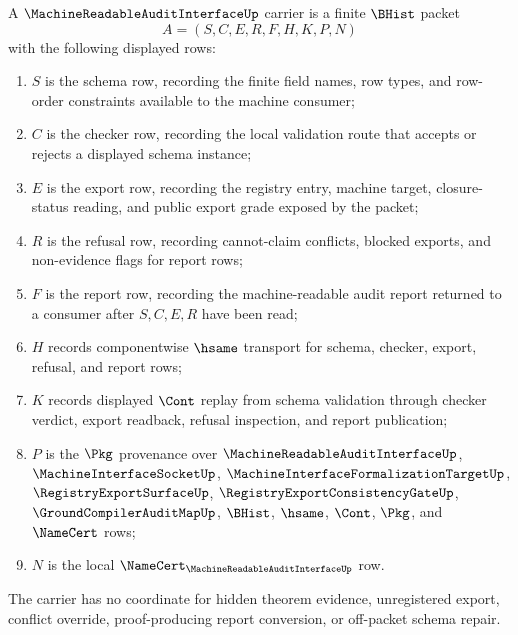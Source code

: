 \begin{definition}
\label{def:machine-readable-audit-interface-carrier}
A $\MachineReadableAuditInterfaceUp$ carrier is a finite $\BHist$ packet
$$
A=(S,C,E,R,F,H,K,P,N)
$$
with the following displayed rows:
\begin{enumerate}
\item $S$ is the schema row, recording the finite field names, row types, and row-order constraints available to the machine consumer;
\item $C$ is the checker row, recording the local validation route that accepts or rejects a displayed schema instance;
\item $E$ is the export row, recording the registry entry, machine target, closure-status reading, and public export grade exposed by the packet;
\item $R$ is the refusal row, recording cannot-claim conflicts, blocked exports, and non-evidence flags for report rows;
\item $F$ is the report row, recording the machine-readable audit report returned to a consumer after $S,C,E,R$ have been read;
\item $H$ records componentwise $\hsame$ transport for schema, checker, export, refusal, and report rows;
\item $K$ records displayed $\Cont$ replay from schema validation through checker verdict, export readback, refusal inspection, and report publication;
\item $P$ is the $\Pkg$ provenance over $\MachineReadableAuditInterfaceUp$, $\MachineInterfaceSocketUp$, $\MachineInterfaceFormalizationTargetUp$, $\RegistryExportSurfaceUp$, $\RegistryExportConsistencyGateUp$, $\GroundCompilerAuditMapUp$, $\BHist$, $\hsame$, $\Cont$, $\Pkg$, and $\NameCert$ rows;
\item $N$ is the local $\NameCert_{\MachineReadableAuditInterfaceUp}$ row.
\end{enumerate}
The carrier has no coordinate for hidden theorem evidence, unregistered export, conflict override, proof-producing report conversion, or off-packet schema repair.
\end{definition}

